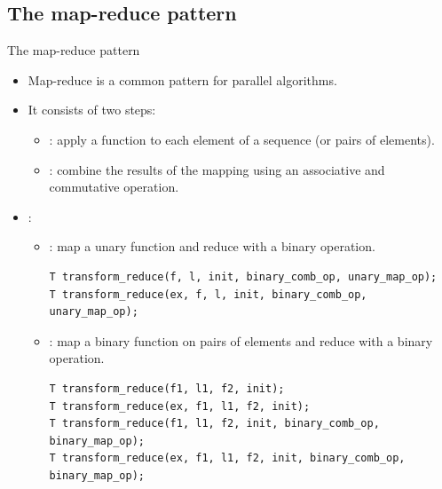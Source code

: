 \subsection{The map-reduce pattern}

\begin{frame}[t,fragile]{The map-reduce pattern}
  \begin{itemize}
    \item Map-reduce is a common pattern for parallel algorithms.
    \item It consists of two steps:
      \begin{itemize}
        \item {}: apply a function to each element of a sequence (or pairs of elements).
        \item {}: combine the results of the mapping using an associative and commutative operation.
      \end{itemize}

    \item {}:
      \begin{itemize}
        \item {}: map a unary function and reduce with a binary operation.
\begin{lstlisting}
T transform_reduce(f, l, init, binary_comb_op, unary_map_op);
T transform_reduce(ex, f, l, init, binary_comb_op, unary_map_op);
\end{lstlisting}

        \item {}: map a binary function on pairs of elements and reduce with a binary operation.
\begin{lstlisting}
T transform_reduce(f1, l1, f2, init);
T transform_reduce(ex, f1, l1, f2, init);
T transform_reduce(f1, l1, f2, init, binary_comb_op, binary_map_op);
T transform_reduce(ex, f1, l1, f2, init, binary_comb_op, binary_map_op);
\end{lstlisting}
      \end{itemize}
  \end{itemize}
\end{frame}


